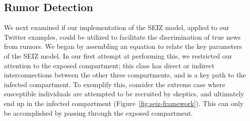 \subsection{Rumor Detection}
We next examined if our implementation of the SEIZ model, applied to our Twitter examples, could be utilized to facilitate the discrimination of true news from rumors. We began by assembling an equation to relate the key parameters of the SEIZ model. In our first attempt at performing this, we restricted our attention to the exposed compartment; this class has direct or indirect interconnections between the other three compartments, and is a key path to the infected compartment. To exemplify this, consider the extreme case where susceptible individuals are attempted to be recruited by skeptics, and ultimately end up in the infected compartment (Figure~\ref{fig:seiz-framework}). This can only be accomplished by passing through the exposed compartment.




